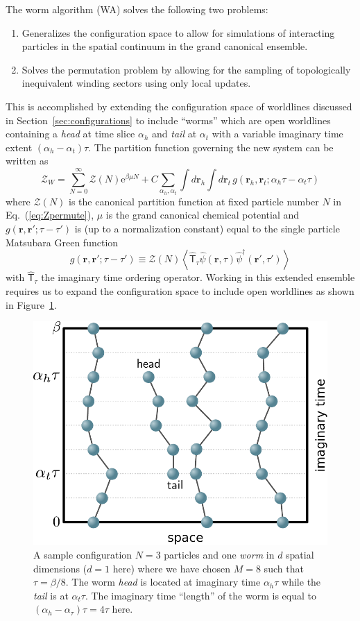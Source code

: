 \documentclass[prb,10pt,aps,floatfix,notitlepage]{revtex4-1}
\renewcommand{\vec}[1]{\boldsymbol{#1}}
\newcommand{\e}[1]{\mathrm{e}^{#1}}
\renewcommand{\eqref}[1]{Eq.~(\ref{#1})}
\begin{document}
The worm algorithm \cite{Boninsegni:2006ed,Boninsegni:2006gc} (WA) solves the following two problems:
\begin{enumerate}
    \item Generalizes the configuration space to allow for simulations of
        interacting particles in the spatial continuum in the grand canonical
        ensemble.
    \item Solves the permutation problem by allowing for the sampling of
        topologically inequivalent winding sectors using only local updates.
\end{enumerate}
This is accomplished by extending the configuration space of worldlines
discussed in Section~\ref{sec:configurations} to include ``worms'' which are
open worldlines containing a \emph{head} at time slice $\alpha_h $ and \emph{tail} at
$\alpha_t$ with a variable imaginary time extent $(\alpha_h -
\alpha_t)\tau$.  The partition function governing the new system can be written
as
%
\begin{equation}
    \mathcal{Z}_W = \sum_{N=0}^{\infty} \mathcal{Z}(N) \e{\beta \mu N} + C
    \sum_{\alpha_h,\alpha_t} \int d\vec{r}_h \int d\vec{r}_t\,
    g\left(\vec{r}_h,\vec{r}_t; \alpha_h\tau-\alpha_t \tau\right)
\end{equation}
%
where $\mathcal{Z}(N)$ is the canonical partition function at fixed particle number $N$
in \eqref{eq:Zpermute}, $\mu$ is the grand canonical chemical potential and
$g(\vec{r},\vec{r'};\tau-\tau')$ is (up to a normalization constant)
equal to the single particle Matsubara Green function
%
\begin{equation}
    g(\vec{r},\vec{r'};\tau-\tau') \equiv \mathcal{Z}(N)\left \langle 
\hat{\mathsf{T}}_\tau \hat{\psi}(\vec{r},\tau)\hat{\psi}^\dagger(\vec{r}',\tau')
\right \rangle
\end{equation}
%
with $\hat{\mathsf{T}}_\tau$ the imaginary time ordering operator. Working
in this extended ensemble requires us to expand the configuration space to
include open worldlines as shown in Figure~\ref{fig:worm}.  
%
\begin{figure}
\begin{center}
\includegraphics[width=0.40\columnwidth]{Figures/worm.pdf}
\end{center}
\caption{A sample configuration $N=3$ particles and one \emph{worm} in $d$
spatial dimensions ($d=1$ here) where we have chosen $M=8$ such that $\tau
= \beta/8$. The worm \emph{head} is located at imaginary time $\alpha_h \tau$ while
the \emph{tail} is at $\alpha_t \tau$. The imaginary time ``length'' of the worm is
equal to $(\alpha_h-\alpha_\tau)\tau = 4\tau$ here.}
\label{fig:worm}
 \end{figure}
\end{document}
